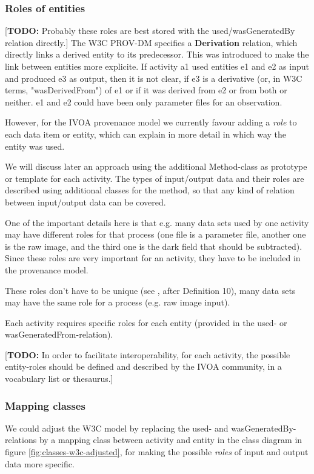 \documentclass[11pt,a4paper]{ivoa}
\newcommand{\TODO}[1]{\noindent \textcolor{todocolor}{[\textbf{TODO:} #1]}}
\begin{document}
\subsubsection{Roles of entities}
\TODO{Probably these roles are best stored with the used/wasGeneratedBy relation directly.}
The W3C PROV-DM specifies a \textbf{Derivation} relation, which directly links a derived entity to its predecessor. This was introduced to make the link between entities more explicite. If activity a1 used entities e1 and e2 as input and produced e3 as output, then it is not clear, if e3 is a derivative (or, in W3C terms, "wasDerivedFrom") of e1 or if it was derived from e2 or from both or neither. e1 and e2 could have been only parameter files for an observation.  

However, for the IVOA provenance model we currently favour adding a \emph{role} to each data item or entity, which can explain in more detail in which way the entity was used.

We will discuss later an approach using the additional Method-class as prototype or template for each activity.
The types of input/output data and their roles are described using additional classes for the method, so that any kind of relation between input/output data can be covered.

One of the important details here is that e.g. many data sets used by one activity may have different roles for that process (one file is a parameter file, another one is the raw image, and the third one is the dark field that should be subtracted). Since these roles are very important for an activity, they have to be included in the provenance model.

These roles don't have to be unique (see \cite{moreau2010}, after Definition 10), many data sets may have the same role for a process (e.g. raw image input).

Each activity requires specific roles for each entity (provided in the used- or wasGeneratedFrom-relation). 

\TODO{In order to facilitate interoperability, for each activity, the possible entity-roles should be defined and described by the IVOA community, in a vocabulary list or thesaurus.}


\subsubsection{Mapping classes}
We could adjust the W3C model by 
replacing the used- and wasGeneratedBy-relations by a mapping class between activity and entity in the class diagram in figure \ref{fig:classes-w3c-adjusted}, for making the possible \emph{roles} of input and output data more specific.
\end{document}
